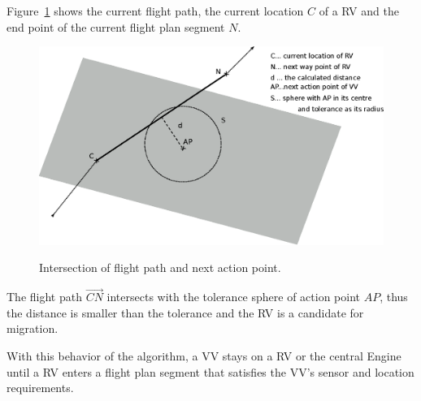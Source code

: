 Figure~\ref{fig:intersectionExample} shows the current flight path, the current location $C$ of a \ac{RV} and the 
end point of the current flight plan segment $N$.
\begin{figure}[h]
	\begin{center}
		{
            \includegraphics[width=12cm]{dist.eps}
        }
	\end{center}
	\caption{Intersection of flight path and next action point.\label{fig:intersectionExample}}
\end{figure}
The flight path $\displaystyle{\overrightarrow{CN}}$ intersects with the tolerance sphere of action point $AP$, thus
the distance is smaller than the tolerance and the \ac{RV} is a candidate for migration.

With this behavior of the algorithm, a \ac{VV} stays on a \ac{RV} or the central Engine until a \ac{RV}
enters a flight plan segment that satisfies the \ac{VV}'s sensor and location requirements.


